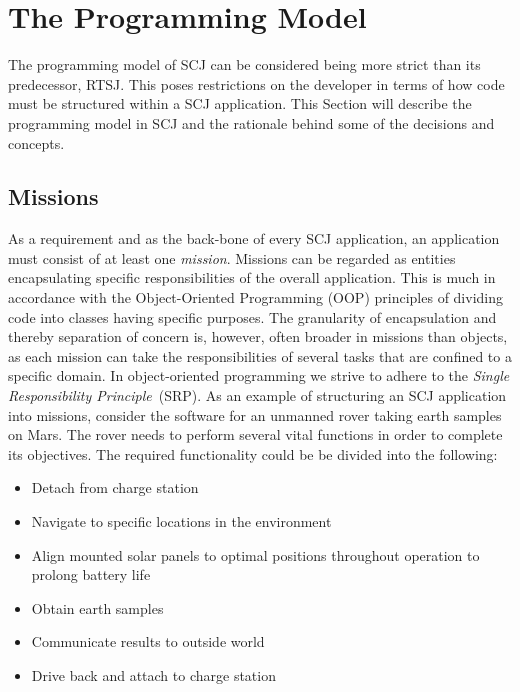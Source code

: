 \section{The Programming Model}
\label{section:programmingmodel}
The programming model of SCJ can be considered being more strict than its predecessor, RTSJ. This poses restrictions on the developer in terms of how code must be structured within a SCJ application.
This Section will describe the programming model in SCJ and the rationale behind some of the decisions and concepts.

\subsection{Missions}
As a requirement and as the back-bone of every SCJ application, an application must consist of at least one \textit{mission}. Missions can be regarded as entities encapsulating specific responsibilities of the overall application. This is much in accordance with the Object-Oriented Programming (OOP) principles of dividing code into classes having specific purposes. The granularity of encapsulation and thereby separation of concern is, however, often broader in missions than objects, as each mission can take the responsibilities of several tasks that are confined to a specific domain. In object-oriented programming we strive to adhere to the \textit{Single Responsibility Principle}~(SRP). As an example of structuring an SCJ application into missions, consider the software for an unmanned rover taking earth samples on Mars. The rover needs to perform several vital functions in order to complete its objectives. The required functionality could be be divided into the following:

\begin{itemize}
	\item Detach from charge station
	\item Navigate to specific locations in the environment
	\item Align mounted solar panels to optimal positions throughout operation to prolong battery life
	\item Obtain earth samples
	\item Communicate results to outside world
	\item Drive back and attach to charge station
\end{itemize}

